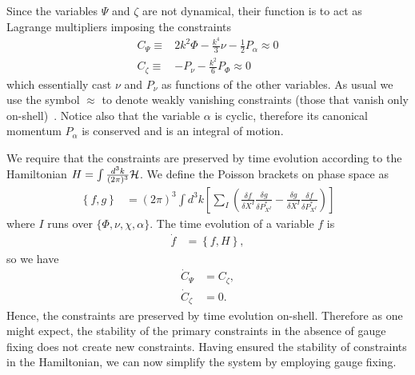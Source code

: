 \documentclass[twocolumn,prd,preprintnumbers,amsmath,amssymb,nofootinbib,superscriptaddress]{revtex4-1}
\newcommand{\Poisson}[2]{\ensuremath{ \left\{ #1, #2\right\} }}
\newcommand{\Hcal}{{\cal H}}
\newcommand{\Gt}{\ensuremath{\tilde{G}}}
\begin{document}
Since the  variables $\Psi$ and $\zeta$ are not dynamical, their function is to act as Lagrange multipliers imposing the constraints
\begin{align}
C_\Psi \equiv & 2 k^2   \Phi - \frac{k^4}{3}    \nu - \frac{1}{2} P_\alpha %
\approx 0
\\
C_\zeta \equiv &  - P_\nu - \frac{k^2}{6}  P_\Phi   %
\approx 0
\end{align}
which essentially cast $\nu$ and $P_\nu$ as functions of the other variables. As usual we use the symbol $\approx$ to denote weakly vanishing constraints (those that vanish only on-shell)~\cite{Dirac:1958sq}.
Notice also that the variable $\alpha$ is cyclic, therefore its canonical momentum $P_\alpha$ is conserved and is an integral of motion.




%
 We require that the constraints are preserved by time evolution according to the Hamiltonian $H = \int \frac{d^{3}k}{(2\pi)^3}\Hcal $. We define the Poisson brackets on phase space as 
\begin{align}
\Poisson{f}{g}
 &=  (2\pi)^{3}\int d^{3}k \left[ \sum_I  \left(\frac{\delta f}{\delta X^I} \frac{\delta g}{\delta P^*_{X^I}} -  \frac{\delta g}{\delta X^I} \frac{\delta f}{\delta P^*_{X^I}} \right)
  \right]
\end{align}
where $I$ runs over $\{\Phi, \nu, \chi, \alpha\}$.  The time evolution of a variable $f$ is
\begin{align}
\dot{f} &= \Poisson{f}{H},
\end{align}
so we have
\begin{align}
\dot{C}_{\Psi} & = C_{\zeta},
\\
\dot{C}_{\zeta} &=0.
\end{align}
Hence, the constraints are preserved by time evolution on-shell.
 Therefore as one might expect, the stability of the primary constraints in the absence of gauge fixing does not create new constraints. 
Having ensured the stability of constraints in the Hamiltonian, we can now simplify the system by employing gauge fixing.
\end{document}
